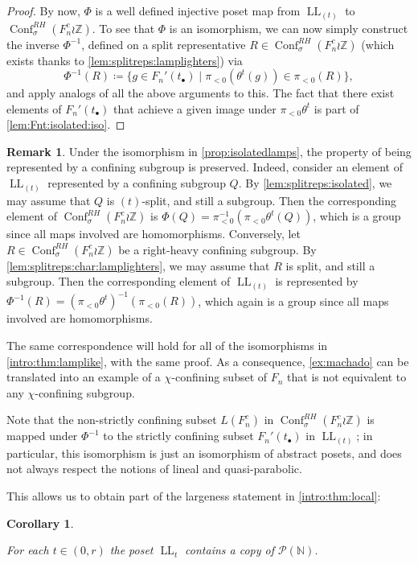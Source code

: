 \documentclass[reqno,12pt]{amsart}\setcounter{tocdepth}{1}
\newtheorem{corollary}[theorem]{Corollary}
\theoremstyle{definition}
\newtheorem{remark}[theorem]{Remark}
\newcommand{\N}{\mathbb{N}}
\newcommand{\Z}{\mathbb{Z}}
\DeclareMathOperator{\Conf}{Conf}
\DeclareMathOperator{\LL}{LL}
\numberwithin{equation}{section}
\begin{document}
\begin{proof}
By now, $\Phi$ is a well defined injective poset map from $\LL_{(t)}$ to $\Conf_\sigma^{RH}(F_n^c \wr \Z)$. To see that $\Phi$ is an isomorphism, we can now simply construct the inverse $\Phi^{-1}$, defined on a split representative $R \in \Conf_\sigma^{RH}(F_n^c \wr \Z)$ (which exists thanks to \cref{lem:splitreps:lamplighters}) via
\[\Phi^{-1}(R) \coloneqq \{ g \in F_n'(t_\bullet) \mid \pi_{<0}(\theta^t (g)) \in \pi_{<0}(R) \},\]
and apply analogs of all the above arguments to this. The fact that there exist elements of $F_n'(t_\bullet)$ that achieve a given image under $\pi_{<0}\theta^t$ is part of \cref{lem:Fnt:isolated:iso}.
\end{proof}

\begin{remark}
\label{rem:lamplike:subgroup}
    Under the isomorphism in \cref{prop:isolatedlamps}, the property of being represented by a confining subgroup is preserved. Indeed, consider an element of $\LL_{(t)}$ represented by a confining subgroup $Q$. By \cref{lem:splitreps:isolated}, we may assume that $Q$ is $(t)$-split, and still a subgroup. Then the corresponding element of $\Conf_\sigma^{RH}(F_n^c \wr \Z)$ is $\Phi(Q) = \pi_{<0}^{-1}(\pi_{<0} \theta^t(Q))$, which is a group since all maps involved are homomorphisms. Conversely, let $R \in \Conf_\sigma^{RH}(F_n^c \wr \Z)$ be a right-heavy confining subgroup. By \cref{lem:splitreps:char:lamplighters}, we may assume that $R$ is split, and still a subgroup. Then the corresponding element of $\LL_{(t)}$ is represented by $\Phi^{-1}(R) = (\pi_{<0} \theta^t)^{-1}(\pi_{<0}(R))$, which again is a group since all maps involved are homomorphisms.

    The same correspondence will hold for all of the isomorphisms in \cref{intro:thm:lamplike}, with the same proof. As a consequence, \cref{ex:machado} can be translated into an example of a $\chi$-confining subset of $F_n$ that is not equivalent to any $\chi$-confining subgroup.
\end{remark}

Note that the non-strictly confining subset $L(F_n^c)$ in $\Conf_\sigma^{RH}(F_n^c \wr \Z)$ is mapped under $\Phi^{-1}$ to the strictly confining subset $F_n'(t_\bullet)$ in $\LL_{(t)}$; in particular, this isomorphism is just an isomorphism of abstract posets, and does not always respect the notions of lineal and quasi-parabolic.

This allows us to obtain part of the largeness statement in \cref{intro:thm:local}:

\begin{corollary}
\label{cor:P(N):LLt}

For each $t \in (0, r)$ the poset $\LL_t$ contains a copy of $\mathcal{P(\N)}$.
\end{corollary}
\end{document}
